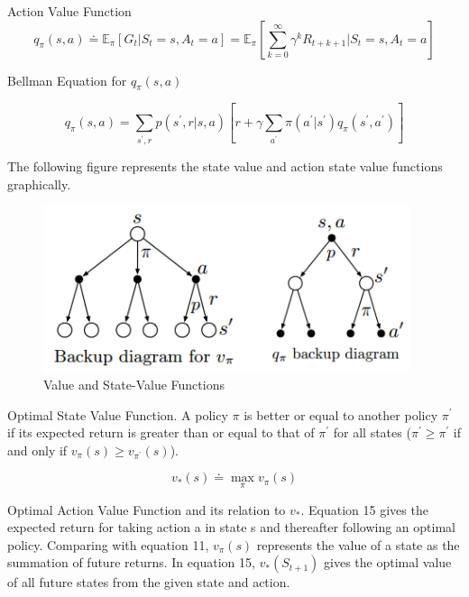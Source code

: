 \documentclass{article}
\begin{document}
\noindent
Action Value Function
\begin{equation}
q_{\pi}(s, a) \doteq \mathbb{E}_{\pi}\left[G_{t} | S_{t}=s, A_{t}=a\right]=\mathbb{E}_{\pi}\left[\sum_{k=0}^{\infty} \gamma^{k} R_{t+k+1} | S_{t}=s, A_{t}=a\right]
\end{equation}

\noindent
Bellman Equation for $q_{\pi}(s, a)$

\begin{equation}
q_{\pi}(s, a)=\sum_{s^{\prime}, r} p\left(s^{\prime}, r | s, a\right)\left[r+\gamma \sum_{a^{\prime}} \pi\left(a^{\prime} | s^{\prime}\right) q_{\pi}\left(s^{\prime}, a^{\prime}\right)\right]
\end{equation}

\noindent
The following figure represents the state value and action state value functions
graphically.

\begin{figure}[h]
\includegraphics[scale=0.5]{value_functions}
\centering
\caption{Value and State-Value Functions}
\end{figure}

\noindent
Optimal State Value Function. A policy $\pi$ is better
or equal to another policy $\pi^{\prime}$ if its expected return is greater than
or equal to that of $\pi^{\prime}$ for all states ($\pi^{\prime} \geq
\pi^{\prime}$ if and only if $v_{\pi}(s) \geq v_{\pi^{\prime}}(s)$). 

\begin{equation}
v_{*}(s) \doteq \max _{\pi} v_{\pi}(s)
\end{equation}

\noindent
Optimal Action Value Function and its relation to $v_{*}$. Equation 15 gives the
expected return for taking action a in state s and thereafter following an
optimal policy. Comparing with equation 11, $v_{\pi}(s)$ represents the value of
a state as the summation of future returns. In equation 15,
$v_{*}\left(S_{t+1}\right)$ gives the optimal value of all future states from
the given state and action.
\end{document}
